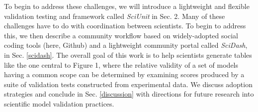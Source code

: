 \documentclass[9pt]{sig-alternate}
\begin{document}
To begin to address these challenges, we will introduce a lightweight and flexible validation testing and framework called \textit{SciUnit} in Sec. 2. Many of these challenges have to do with coordination between scientists. To begin to address this, we then describe a community workflow based on widely-adopted social coding tools (here, Github) and a lightweight community portal called \textit{SciDash}, in Sec. \ref{scidash}. The overall goal of this work is to help scientists generate tables like the one central to Figure 1, where the relative validity of a set of models having a common scope can be determined by examining scores produced by a suite of validation tests constructed from experimental data. 
We discuss adoption strategies and conclude in Sec. \ref{discussion} with directions for future research into scientific model validation practices.






\end{document}
